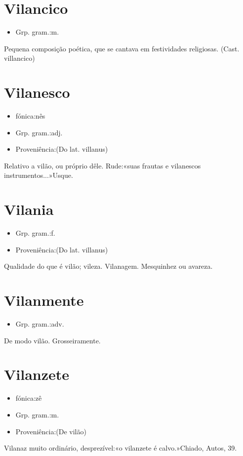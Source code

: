 \documentclass{article}
\begin{document}
\section{Vilancico}
\begin{itemize}
\item {Grp. gram.:m.}
\end{itemize}
Pequena composição poética, que se cantava em festividades religiosas.
(Cast. \textunderscore villancico\textunderscore )
\section{Vilanesco}
\begin{itemize}
\item {fónica:nês}
\end{itemize}
\begin{itemize}
\item {Grp. gram.:adj.}
\end{itemize}
\begin{itemize}
\item {Proveniência:(Do lat. \textunderscore villanus\textunderscore )}
\end{itemize}
Relativo a vilão, ou próprio dêle.
Rude:«\textunderscore suas frautas e vilanescos instrumentos...\textunderscore »Usque.
\section{Vilania}
\begin{itemize}
\item {Grp. gram.:f.}
\end{itemize}
\begin{itemize}
\item {Proveniência:(Do lat. \textunderscore villanus\textunderscore )}
\end{itemize}
Qualidade do que é vilão; vileza.
Vilanagem.
Mesquinhez ou avareza.
\section{Vilanmente}
\begin{itemize}
\item {Grp. gram.:adv.}
\end{itemize}
De modo vilão.
Grosseiramente.
\section{Vilanzete}
\begin{itemize}
\item {fónica:zê}
\end{itemize}
\begin{itemize}
\item {Grp. gram.:m.}
\end{itemize}
\begin{itemize}
\item {Proveniência:(De \textunderscore vilão\textunderscore )}
\end{itemize}
Vilanaz muito ordinário, desprezível:«\textunderscore o vilanzete é calvo.\textunderscore »Chiado, \textunderscore Autos\textunderscore , 39.
\end{document}

